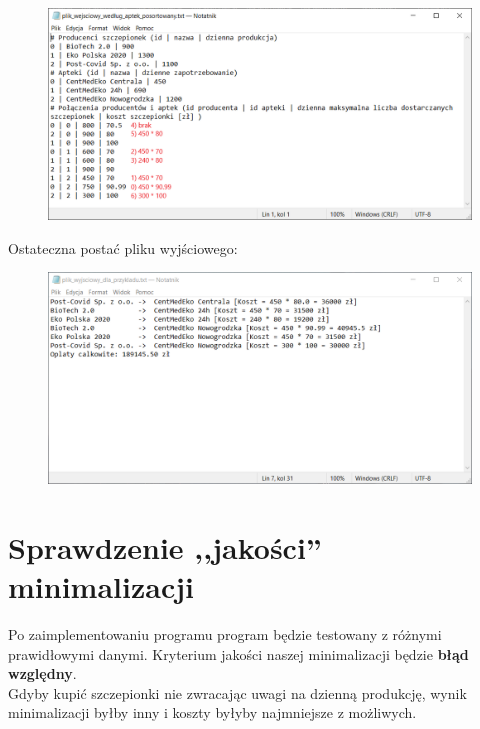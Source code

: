 \documentclass{article}
\begin{document}
\begin{figure} [hbt!]
    \includegraphics[width=16cm,center]{images/plik_wejsciowy_kolejnosc_kupowania.png}
\end{figure}

\clearpage

Ostateczna postać pliku wyjściowego:
\begin{figure} [hbt!]
    \includegraphics[width=16cm,center]{images/plik_wyjsciowy_dla_przykladu.PNG}
\end{figure}

\clearpage

\section{Sprawdzenie ,,jakości'' minimalizacji}
Po zaimplementowaniu programu program będzie testowany z różnymi prawidłowymi danymi.
Kryterium jakości naszej minimalizacji będzie \textbf{błąd względny}.
\\ 
Gdyby kupić szczepionki nie zwracając uwagi na dzienną produkcję, wynik minimalizacji byłby inny i koszty byłyby najmniejsze z możliwych.
\\
\end{document}
